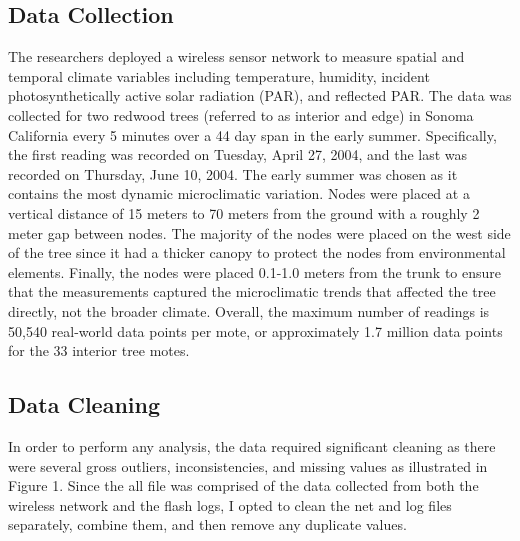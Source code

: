 \documentclass[11pt]{article}
\begin{document}
\subsection{Data Collection}
The researchers deployed a wireless sensor network to measure spatial and temporal climate variables including temperature, humidity, incident photosynthetically active solar radiation (PAR), and reflected PAR.  The data was collected for two redwood trees (referred to as interior and edge) in Sonoma California every 5 minutes over a 44 day span in the early summer. Specifically, the first reading was recorded on Tuesday, April 27, 2004, and the last was recorded on Thursday, June 10, 2004. The early summer was chosen as it contains the most dynamic microclimatic variation. Nodes were placed at a vertical distance of 15 meters to 70 meters from the ground with a roughly 2 meter gap between nodes. The majority of the nodes were placed on the west side of the tree since it had a thicker canopy to protect the nodes from environmental elements. Finally, the nodes were placed 0.1-1.0 meters from the trunk to ensure that the measurements captured the microclimatic trends that affected the tree directly, not the broader climate. Overall, the maximum number of readings is 50,540 real-world data points per mote, or approximately 1.7 million data points for the 33 interior tree motes.  

\subsection{Data Cleaning}
In order to perform any analysis, the data required significant cleaning as there were several gross outliers, inconsistencies, and missing values as illustrated in Figure 1. Since the all file was comprised of the data collected from both the wireless network and the flash logs, I opted to clean the net and log files separately, combine them, and then remove any duplicate values.\\
\end{document}
